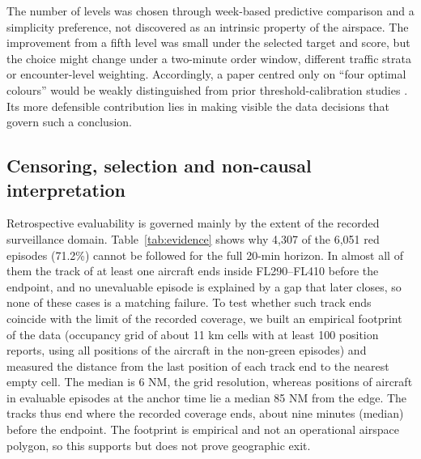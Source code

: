 \documentclass[pdflatex,sn-mathphys-num]{sn-jnl}
\begin{document}
The number of levels was chosen through week-based predictive comparison and a simplicity preference, not discovered as an intrinsic property of the airspace. The improvement from a fifth level was small under the selected target and score, but the choice might change under a two-minute order window, different traffic strata or encounter-level weighting. Accordingly, a paper centred only on ``four optimal colours'' would be weakly distinguished from prior threshold-calibration studies \cite{delgado2022,gaume2025,xia2024}. Its more defensible contribution lies in making visible the data decisions that govern such a conclusion.

\subsection{Censoring, selection and non-causal interpretation}\label{sec:limits}
Retrospective evaluability is governed mainly by the extent of the recorded surveillance domain. Table~\ref{tab:evidence} shows why 4,307 of the 6,051 red episodes (71.2\%) cannot be followed for the full 20-min horizon. In almost all of them the track of at least one aircraft ends inside FL290--FL410 before the endpoint, and no unevaluable episode is explained by a gap that later closes, so none of these cases is a matching failure. To test whether such track ends coincide with the limit of the recorded coverage, we built an empirical footprint of the data (occupancy grid of about 11 km cells with at least 100 position reports, using all positions of the aircraft in the non-green episodes) and measured the distance from the last position of each track end to the nearest empty cell. The median is 6 NM, the grid resolution, whereas positions of aircraft in evaluable episodes at the anchor time lie a median 85 NM from the edge. The tracks thus end where the recorded coverage ends, about nine minutes (median) before the endpoint. The footprint is empirical and not an operational airspace polygon, so this supports but does not prove geographic exit.
\end{document}
